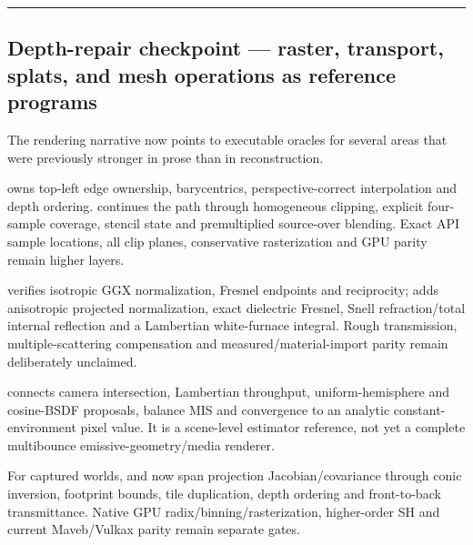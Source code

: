 \begin{center}\rule{0.5\linewidth}{0.5pt}\end{center}

\subsection{Depth-repair checkpoint --- raster, transport, splats, and mesh operations as reference programs}\label{04-visual-computing-ii-ch043-depth-repair-checkpoint-raster-transport-splats-and-mesh-operations-as-reference-programs}

\hypertarget{04-visual-computing-ii-ch043-depth-repair-checkpoint-raster-transport-splats-and-mesh-operations-as-reference-programs}{}

The rendering narrative now points to executable oracles for several areas that were previously stronger in prose than in reconstruction.

 owns top-left edge ownership, barycentrics, perspective-correct interpolation and depth ordering.  continues the path through homogeneous clipping, explicit four-sample coverage, stencil state and premultiplied source-over blending. Exact API sample locations, all clip planes, conservative rasterization and GPU parity remain higher layers.

 verifies isotropic GGX normalization, Fresnel endpoints and reciprocity;  adds anisotropic projected normalization, exact dielectric Fresnel, Snell refraction/total internal reflection and a Lambertian white-furnace integral. Rough transmission, multiple-scattering compensation and measured/material-import parity remain deliberately unclaimed.

 connects camera intersection, Lambertian throughput, uniform-hemisphere and cosine-BSDF proposals, balance MIS and convergence to an analytic constant-environment pixel value. It is a scene-level estimator reference, not yet a complete multibounce emissive-geometry/media renderer.

For captured worlds,  and  now span projection Jacobian/covariance through conic inversion, footprint bounds, tile duplication, depth ordering and front-to-back transmittance. Native GPU radix/binning/rasterization, higher-order SH and current Maveb/Vulkax parity remain separate gates.

